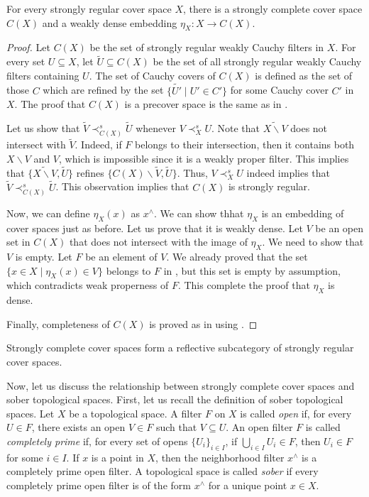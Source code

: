 \documentclass[reqno]{amsart}
\theoremstyle{definition}
\theoremstyle{remark}
\numberwithin{figure}{section}
\newcommand{\rb}{\prec}
\begin{document}
\begin{thm}
For every strongly regular cover space $X$, there is a strongly complete cover space $C(X)$ and a weakly dense embedding $\eta_X : X \to C(X)$.
\end{thm}
\begin{proof}
Let $C(X)$ be the set of strongly regular weakly Cauchy filters in $X$.
For every set $U \subseteq X$, let $\widetilde{U} \subseteq C(X)$ be the set of all strongly regular weakly Cauchy filters containing $U$.
The set of Cauchy covers of $C(X)$ is defined as the set of those $C$ which are refined by the set $\{ \widetilde{U'} \mid U' \in C' \}$ for some Cauchy cover $C'$ in $X$.
The proof that $C(X)$ is a precover space is the same as in .

Let us show that $\widetilde{V} \rb^s_{C(X)} \widetilde{U}$ whenever $V \rb^s_X U$.
Note that $\widetilde{X \backslash V}$ does not intersect with $\widetilde{V}$.
Indeed, if $F$ belongs to their intersection, then it contains both $X \backslash V$ and $V$, which is impossible since it is a weakly proper filter.
This implies that $\{ \widetilde{X \backslash V}, \widetilde{U} \}$ refines $\{ C(X) \backslash \widetilde{V}, \widetilde{U} \}$.
Thus, $V \rb^s_X U$ indeed implies that $\widetilde{V} \rb^s_{C(X)} \widetilde{U}$.
This observation implies that $C(X)$ is strongly regular.

Now, we can define $\eta_X(x)$ as $x^\wedge$.
We can show thhat $\eta_X$ is an embedding of cover spaces just as before.
Let us prove that it is weakly dense.
Let $V$ be an open set in $C(X)$ that does not intersect with the image of $\eta_X$.
We need to show that $V$ is empty.
Let $F$ be an element of $V$.
We already proved that the set $\{ x \in X \mid \eta_X(x) \in V \}$ belongs to $F$ in , but this set is empty by assumption, which contradicts weak properness of $F$.
This complete the proof that $\eta_X$ is dense.

Finally, completeness of $C(X)$ is proved as in  using .
\end{proof}

\begin{cor}
Strongly complete cover spaces form a reflective subcategory of strongly regular cover spaces.
\end{cor}

Now, let us discuss the relationship between strongly complete cover spaces and sober topological spaces.
First, let us recall the definition of sober topological spaces.
Let $X$ be a topological space.
A filter $F$ on $X$ is called \emph{open} if, for every $U \in F$, there exists an open $V \in F$ such that $V \subseteq U$.
An open filter $F$ is called \emph{completely prime} if, for every set of opens $\{ U_i \}_{i \in I}$, if $\bigcup_{i \in I} U_i \in F$, then $U_i \in F$ for some $i \in I$.
If $x$ is a point in $X$, then the neighborhood filter $x^\wedge$ is a completely prime open filter.
A topological space is called \emph{sober} if every completely prime open filter is of the form $x^\wedge$ for a unique point $x \in X$.
\end{document}
